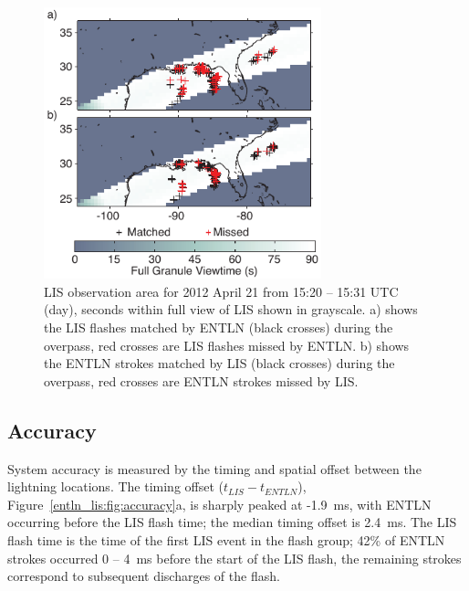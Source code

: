 \begin{figure}[t]
   \centering
   \noindent\includegraphics[width=19pc,angle=0]{entln_lis/Figures/overpass.pdf}
   \caption{LIS observation area for 2012 April 21 from 15:20 -- 15:31 UTC (day), seconds within full view of LIS shown in grayscale.
      		a) shows the LIS flashes matched by ENTLN (black crosses) during the overpass, red crosses are LIS flashes missed by ENTLN.
		b) shows the ENTLN strokes matched by LIS (black crosses) during the overpass, red crosses are ENTLN strokes missed by LIS.
		}
   \label{entln_lis:fig:overpass}
\end{figure}

\subsection{Accuracy}

System accuracy is measured by the timing and spatial offset between the lightning locations.
The timing offset ($t_{LIS} - t_{ENTLN}$), Figure~\ref{entln_lis:fig:accuracy}a, is sharply peaked at -1.9~ms, with ENTLN occurring before the LIS flash time; the median timing offset is 2.4~ms.
The LIS flash time is the time of the first LIS event in the flash group; 42\% of ENTLN strokes occurred 0 -- 4~ms before the start of the LIS flash, the remaining strokes correspond to subsequent discharges of the flash.

